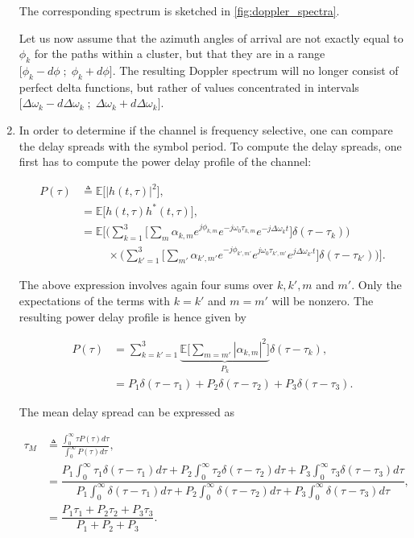 \documentclass [a4paper, 11pt] {article}
\begin{document}
\begin{solution}
\begin{enumerate}
        The corresponding spectrum is sketched in \autoref{fig:doppler_spectra}.

        

        Let us now assume that the azimuth angles of arrival are not exactly equal to $\phi_k$ for the paths within a cluster, but that they are in a range $\big[\phi_k-d\phi \; ; \; \phi_k+d\phi \big]$. The resulting Doppler spectrum will no longer consist of perfect delta functions, but rather of values concentrated in intervals $\big[\Delta \omega_k-d \Delta \omega_k  \; ; \; \Delta \omega_k+d \Delta \omega_k  \big]$.

        \item In order to determine if the channel is frequency selective, one can compare the delay spreads with the symbol period. To compute the delay spreads, one first has to compute the power delay profile of the channel:

        \begin{align}
            P(\tau) &\triangleq \mathbb{E}\Big[|h(t,\tau)|^2\Big], \\
            &= \mathbb{E}\Big[h(t,\tau)h^*(t,\tau)\Big],\\
            &= \mathbb{E}\Bigg[\Big( \sum_{k=1}^{3} \Big[ \sum_m \alpha_{k,m} e^{j\phi_{k,m}}e^{-j\omega_0 \tau_{k,m}}e^{-j\Delta \omega_{k} t}\Big] \delta(\tau-\tau_k) \Big) \\
            &\hspace{1cm}\times\Big( \sum_{k'=1}^{3} \Big[ \sum_{m'} \alpha_{k',m'} e^{-j\phi_{k',m'}}e^{j\omega_0 \tau_{k',m'}}e^{j\Delta \omega_{k'} t}\Big] \delta(\tau-\tau_{k'})\Big) \Bigg]\nonumber.
        \end{align}

        The above expression involves again four sums over $k,k',m$ and $m'$. Only the expectations of the terms with $k=k'$ and $m=m'$ will be nonzero. The resulting power delay profile is hence given by

        \begin{align}
            P(\tau) &= \sum_{k =k'=1}^{3} \underbrace{\mathbb{E}\Bigg[\sum_{m = m'} | \alpha_{k,m}|^2 \Bigg]}_{P_k} \delta(\tau-\tau_{k}),\\
            &= P_1\delta(\tau-\tau_{1}) + P_2\delta(\tau-\tau_{2}) + P_3\delta(\tau-\tau_{3}).
        \end{align}

        The mean delay spread can be expressed as

        \begin{align}
            \tau_M &\triangleq \frac{\int_0^\infty \tau P(\tau) d\tau}{\int_0^\infty P(\tau) d\tau}, \\
            &= \dfrac{P_1\int_0^\infty \tau_1 \delta(\tau-\tau_{1}) d\tau + P_2\int_0^\infty \tau_2 \delta(\tau-\tau_{2}) d\tau + P_3\int_0^\infty \tau_3 \delta(\tau-\tau_{3}) d\tau }{P_1\int_0^\infty \delta(\tau-\tau_{1}) d\tau + P_2\int_0^\infty \delta(\tau-\tau_{2}) d\tau + P_3\int_0^\infty \delta(\tau-\tau_{3}) d\tau },\\
            &= \dfrac{P_1\tau_1 + P_2\tau_2 + P_3\tau_3}{P_1+P_2+P_3}.
        \end{align}


\end{enumerate}
\end{solution}
\end{document}
